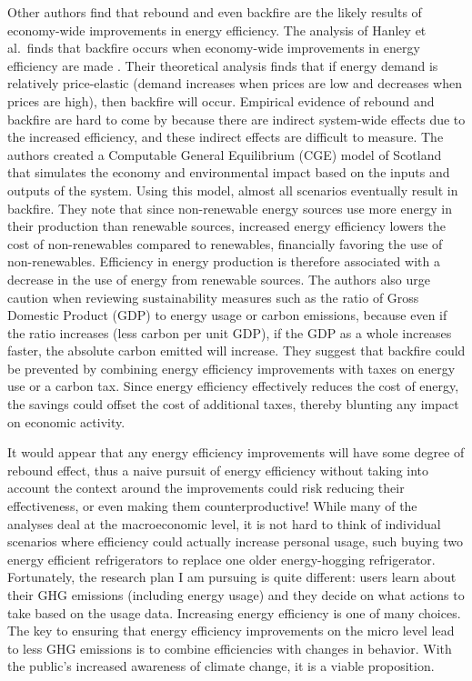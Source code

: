 Other authors find that rebound and even backfire are the likely results of economy-wide improvements in energy efficiency. The analysis of Hanley et al.\ finds that backfire occurs when economy-wide improvements in energy efficiency are made \cite{Hanley2008Do-increases-in}. Their theoretical analysis finds that if energy demand is relatively price-elastic (demand increases when prices are low and decreases when prices are high), then backfire will occur. Empirical evidence of rebound and backfire are hard to come by because there are indirect system-wide effects due to the increased efficiency, and these indirect effects are difficult to measure. The authors created a Computable General Equilibrium (CGE) model of Scotland that simulates the economy and environmental impact based on the inputs and outputs of the system. Using this model, almost all scenarios eventually result in backfire. They note that since non-renewable energy sources use more energy in their production than renewable sources, increased energy efficiency lowers the cost of non-renewables compared to renewables, financially favoring the use of non-renewables. Efficiency in energy production is therefore associated with a decrease in the use of energy from renewable sources. The authors also urge caution when reviewing sustainability measures such as the ratio of Gross Domestic Product (GDP) to energy usage or carbon emissions, because even if the ratio increases (less carbon per unit GDP), if the GDP as a whole increases faster, the absolute carbon emitted will increase. They suggest that backfire could be prevented by combining energy efficiency improvements with taxes on energy use or a carbon tax. Since energy efficiency effectively reduces the cost of energy, the savings could offset the cost of additional taxes, thereby blunting any impact on economic activity.

It would appear that any energy efficiency improvements will have some degree of rebound effect, thus a naive pursuit of energy efficiency without taking into account the context around the improvements could risk reducing their effectiveness, or even making them counterproductive! While many of the analyses deal at the macroeconomic level, it is not hard to think of individual scenarios where efficiency could actually increase personal usage, such buying two energy efficient refrigerators to replace one older energy-hogging refrigerator. Fortunately, the research plan I am pursuing is quite different: users learn about their GHG emissions (including energy usage) and they decide on what actions to take based on the usage data. Increasing energy efficiency is one of many choices. The key to ensuring that energy efficiency improvements on the micro level lead to less GHG emissions is to combine efficiencies with changes in behavior. With the public's increased awareness of climate change, it is a viable proposition.

